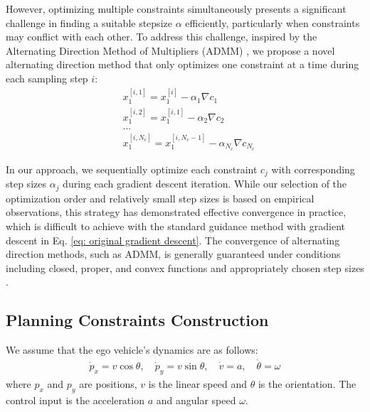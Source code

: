 
However, optimizing multiple constraints simultaneously presents a significant challenge in finding a suitable stepsize $\alpha$ efficiently, 
particularly when constraints may conflict with each other.
To address this challenge, inspired by the Alternating Direction Method of Multipliers (ADMM) \citep{boyd2011distributed}, we propose a novel alternating direction method that only optimizes one constraint at a time during each sampling step $i$:
\begin{align} \label{eq: gradient step}
    &x_1^{[i, 1]} = x_1^{[i]} - \alpha_{1} \nabla c_{1} \nonumber \\
    &x_1^{[i, 2]} = x_1^{[i, 1]} - \alpha_{2} \nabla c_{2}  \nonumber\\
    &... \nonumber\\
    &x_1^{[i, N_c]} = x_1^{[i, N_c - 1]} - \alpha_{N_c} \nabla c_{N_c}
\end{align}

In our approach, we sequentially optimize each constraint $c_j$ with corresponding step sizes $\alpha_j$
during each gradient descent iteration. 
While our selection of the optimization order and relatively small step sizes is based on empirical observations, this strategy has demonstrated effective convergence in practice, which is difficult to achieve with the standard guidance method with gradient descent in Eq. \eqref{eq: original gradient descent}.
The convergence of alternating direction methods, such as ADMM, is generally guaranteed under conditions including closed, proper, and convex functions and appropriately chosen step sizes \citep{boyd2011distributed}.

\subsection{Planning Constraints Construction} \label{sec: planning constraints}
We assume that the ego vehicle's dynamics are as follows:
\begin{align} \label{eq: dynamics equation}
    \dot p_x = v \cos \theta, \quad \dot p_y = v \sin \theta, \quad
    \dot v = a, \quad \dot \theta = \omega
\end{align}
where $p_x$ and $p_y$ are positions, $v$ is the linear speed and $\theta$ is the orientation.
The control input is the acceleration $a$ and angular speed $\omega$.

